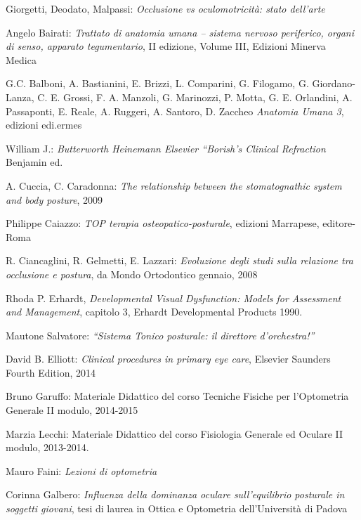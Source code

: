 \begin{thebibliography}{9}

Giorgetti, Deodato, Malpassi: \emph{Occlusione vs oculomotricità: stato dell’arte}

Angelo Bairati: \emph{Trattato di anatomia umana – sistema nervoso periferico, organi di senso, apparato tegumentario}, II edizione, Volume III, Edizioni Minerva Medica

G.C. Balboni, A. Bastianini, E. Brizzi, L. Comparini, G. Filogamo, G. Giordano-Lanza, C. E. Grossi, F. A. Manzoli, G. Marinozzi, P. Motta, G. E. Orlandini, A. Passaponti, E. Reale, A. Ruggeri, A. Santoro, D. Zaccheo \emph{Anatomia Umana 3}, edizioni edi.ermes

William J.: \emph{Butterworth Heinemann Elsevier “Borish’s Clinical Refraction} Benjamin ed.

A. Cuccia, C. Caradonna: \emph{The relationship between the stomatognathic system and body posture}, 2009

Philippe Caiazzo: \emph{TOP terapia osteopatico-posturale}, edizioni Marrapese, editore-Roma

R. Ciancaglini, R. Gelmetti, E. Lazzari: \emph{Evoluzione degli studi sulla relazione tra occlusione e postura}, da Mondo Ortodontico gennaio, 2008

Rhoda P. Erhardt, \emph{Developmental Visual Dysfunction: Models for Assessment and Management}, capitolo 3, Erhardt Developmental Products 1990.

Mautone Salvatore: \emph{“Sistema Tonico posturale: il direttore d’orchestra!”}

David B. Elliott: \emph{Clinical procedures in primary eye care}, Elsevier Saunders Fourth Edition, 2014

Bruno Garuffo: Materiale Didattico del corso Tecniche Fisiche per l’Optometria Generale II modulo, 2014-2015

Marzia Lecchi: Materiale Didattico del corso Fisiologia Generale ed Oculare II modulo, 2013-2014.

Mauro Faini: \emph{Lezioni di optometria}

Corinna Galbero: \emph{Influenza della dominanza oculare sull’equilibrio posturale in soggetti giovani}, tesi di laurea in Ottica e Optometria dell’Università di Padova 


\end{thebibliography}
